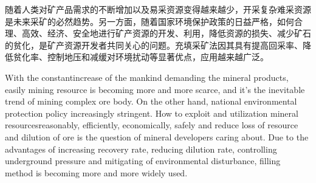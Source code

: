 \begin{cabstract}%
	随着人类对矿产品需求的不断增加以及易采资源变得越来越少，开采复杂难采资源是未来采矿的必然趋势。另一方面，随着国家环境保护政策的日益严格，如何合理、高效、经济、安全地进行矿产资源的开发、利用，降低资源的损失、减少矿石的贫化，是矿产资源开发者共同关心的问题。充填采矿法因其具有提高回采率、降低贫化率、控制地压和减缓对环境扰动等显著优点，应用越来越广泛。
\end{cabstract}

    
\begin{eabstract}%
With the constantincrease of the mankind demanding the mineral products, easily mining resource is becoming more and more scarce, and it’s the inevitable trend of mining complex ore body. On the other hand, national environmental protection policy increasingly stringent. How to exploit and utilization mineral resourcesreasonably, efficiently, economically, safely and reduce loss of resource and dilution of ore is the question of mineral developers caring about. Due to the advantages of increasing recovery rate, reducing dilution rate, controlling underground pressure and mitigating of environmental disturbance, filling method is becoming more and more widely used.
\end{eabstract}

    
